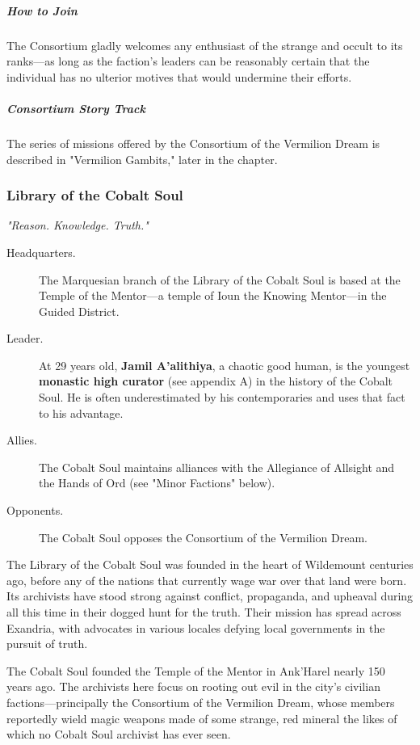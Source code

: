 \documentclass[10pt,a4paper,twoside,fancy,bg=print,twocolumn,openany,nodeprecatedcode]{dndbook}
\begin{document}
\subparagraph{How to Join}
The Consortium gladly welcomes any enthusiast of the strange and occult to its ranks—as long as the faction's leaders can be reasonably certain that the individual has no ulterior motives that would undermine their efforts.

\subparagraph{Consortium Story Track}
The series of missions offered by the Consortium of the Vermilion Dream is described in "Vermilion Gambits," later in the chapter.

\subsubsection{Library of the Cobalt Soul}
\textit{"Reason. Knowledge. Truth."}


\begin{description}
\item[Headquarters.]
The Marquesian branch of the Library of the Cobalt Soul is based at the Temple of the Mentor—a temple of Ioun the Knowing Mentor—in the Guided District.
\end{description}


\begin{description}
\item[Leader.]
At 29 years old, \textbf{Jamil A'alithiya}, a chaotic good human, is the youngest \textbf{monastic high curator} (see appendix A) in the history of the Cobalt Soul. He is often underestimated by his contemporaries and uses that fact to his advantage.
\item[Allies.]
The Cobalt Soul maintains alliances with the Allegiance of Allsight and the Hands of Ord (see "Minor Factions" below).
\item[Opponents.]
The Cobalt Soul opposes the Consortium of the Vermilion Dream.
\end{description}

The Library of the Cobalt Soul was founded in the heart of Wildemount centuries ago, before any of the nations that currently wage war over that land were born. Its archivists have stood strong against conflict, propaganda, and upheaval during all this time in their dogged hunt for the truth. Their mission has spread across Exandria, with advocates in various locales defying local governments in the pursuit of truth.

The Cobalt Soul founded the Temple of the Mentor in Ank'Harel nearly 150 years ago. The archivists here focus on rooting out evil in the city's civilian factions—principally the Consortium of the Vermilion Dream, whose members reportedly wield magic weapons made of some strange, red mineral the likes of which no Cobalt Soul archivist has ever seen.
\end{document}
